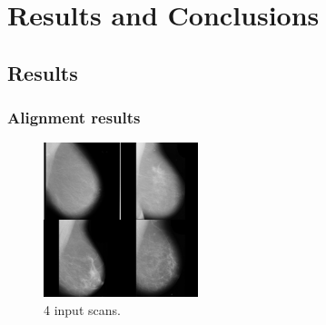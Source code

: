 \chapter{Results and Conclusions}




\section{Results}

\subsection{Alignment results}

\begin{figure}[H]
  \centering
  \includegraphics[width=0.4\textwidth]{Chapter3/results-img/big_scan.png}
  \caption{4 input scans.}
  \label{fig:input-data}
\end{figure}


